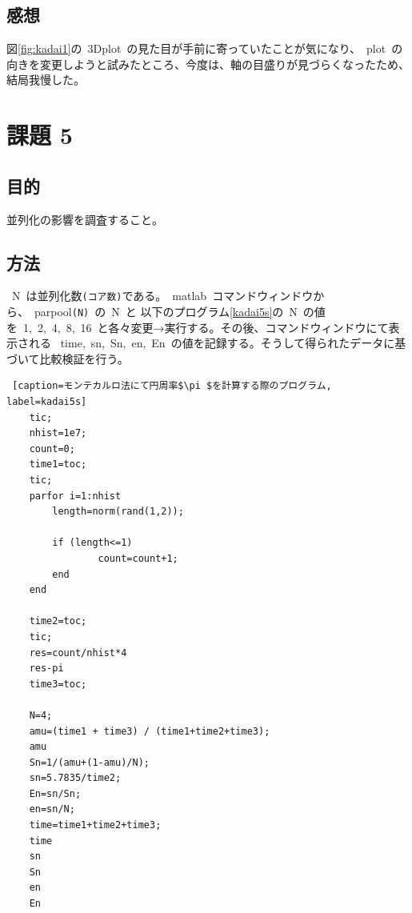 \documentclass[10pt]{jarticle}
\begin{document}
\subsection{感想}
%
図\ref{fig:kadai1}の\ 3Dplot\ の見た目が手前に寄っていたことが気になり、\ plot\ の向きを変更しようと試みたところ、今度は、軸の目盛りが見づらくなったため、
結局我慢した。
%

\section{課題 5}
\subsection{目的} \label{sec:5hajime}
%
並列化の影響を調査すること。
%

\newpage
\subsection{方法} \label{sec:5hoho}
%
\ N\ は並列化数\verb|(コア数)|である。\ matlab\ コマンドウィンドウから、\ parpool\verb|(N)|\ の\ N\ と
以下のプログラム\ref{kadai5s}の\ N\ の値を\ 1,\ 2,\ 4,\ 8,\ 16\ と各々変更→実行する。その後、コマンドウィンドウにて表示される
\ time,\ sn,\ Sn,\ en,\ En\ の値を記録する。そうして得られたデータに基づいて比較検証を行う。
\begin{lstlisting} [caption=モンテカルロ法にて円周率$\pi $を計算する際のプログラム, label=kadai5s]
	tic;
	nhist=1e7;
	count=0;
	time1=toc;
	tic;
	parfor i=1:nhist
		length=norm(rand(1,2));

		if (length<=1)
				count=count+1;
		end
	end

	time2=toc;
	tic;
	res=count/nhist*4
	res-pi
	time3=toc;

	N=4;
	amu=(time1 + time3) / (time1+time2+time3);
	amu
	Sn=1/(amu+(1-amu)/N);
	sn=5.7835/time2;
	En=sn/Sn;
	en=sn/N;
	time=time1+time2+time3;
	time
	sn
	Sn
	en
	En
\end{lstlisting}
%
\end{document}

